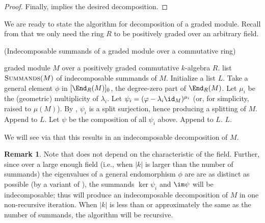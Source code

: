 \documentclass[12pt]{article}
\theoremstyle{theorem}
\numberwithin{thm}{section}
\theoremstyle{definition}
\newtheorem{rem}[thm]{Remark}
\begin{document}
\begin{proof}
  Finally,  implies the desired decomposition.
\end{proof}

We are ready to state the algorithm for decomposition of a graded module. Recall from  that we only need the ring $R$ to be positively graded over an arbitrary field.

\begin{algorithm}[H]
  \caption{(Indecomposable summands of a graded module over a commutative ring)}\label{alg:graded}
  \begin{algorithmic}[1]
    \smallskip
    \Require graded module $M$ over a positively graded commutative $k$-algebra $R$.
    \Ensure  list $\textproc{Summands}(M)$ of indecomposable summands of $M$.
    \State Initialize a list $L$.
    \State Take a general element $\phi$ in $[\End_R(M)]_0$,
           the degree-zero part of $\End_R(M)$. \label{item:End0}
      \State Let $\mu_i$ be the (geometric) multiplicity of $\lambda_i$.
      \State Let $\psi_i = (\phi - \lambda_i \id_M)^{\mu_i}$ (or, for simplicity, raised to $\mu(M)$).
      \State By , $\psi_i$ is a split surjection, hence producing a splitting of $M$.
      \State Append  to $L$.
    \EndFor
    \State Let $\psi$ be the composition of all $\psi_i$ above.
      \State Append  to $L$.
    \EndIf
    \State \Return $L$.
  \end{algorithmic}
\end{algorithm}

We will see via  that this results in an indecomposable decomposition of $M$.

\begin{rem}\label{rem:graded}
  Note that  does not depend on the characteristic of the field. Further, since over a large enough field (i.e., when $|k|$ is larger than the number of summands) the eigenvalues of a general endomorphism $\phi$ are are as distinct as  possible (by a variant of ), the summands $\ker\psi_i$ and $\im\psi$ will be indecomposable; thus  will produce an indecomposable decomposition of $M$ in one non-recursive iteration. When $|k|$ is less than or approximately the same as the number of summands, the algorithm will be recursive.
\end{rem}

\end{document}
